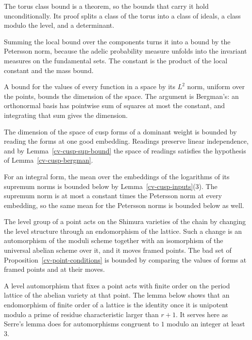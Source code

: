 The torus class bound is a theorem, so the bounds that carry it hold unconditionally. Its proof splits a class
of the torus into a class of ideals, a class modulo the level, and a determinant.

Summing the local bound over the components turns it into a bound by the Petersson norm, because the
adelic probability measure unfolds into the invariant measures on the fundamental sets. The constant
is the product of the local constant and the mass bound.

A bound for the values of every function in a space by its $L^2$ norm, uniform over the points,
bounds the dimension of the space. The argument is Bergman's: an orthonormal basis has pointwise sum of
squares at most the constant, and integrating that sum gives the dimension.

The dimension of the space of cusp forms of a dominant weight is bounded by reading the forms at one
good embedding. Readings preserve linear independence, and by Lemma~\ref{cv-cusp-sup-bound} the space of
readings satisfies the hypothesis of Lemma~\ref{cv-cusp-bergman}.

For an integral form, the mean over the embeddings of the logarithms of its supremum norms is bounded
below by Lemma~\ref{cv-cusp-inputs}(3). The supremum norm is at most a constant times the Petersson norm
at every embedding, so the same mean for the Petersson norms is bounded below as well.

The level group of a point acts on the Shimura varieties of the chain by changing the level structure
through an endomorphism of the lattice. Such a change is an automorphism of the moduli scheme together
with an isomorphism of the universal abelian scheme over it, and it moves framed points. The bad set of
Proposition~\ref{cv-point-conditions} is bounded by comparing the values of forms at framed points and at
their moves.

A level automorphism that fixes a point acts with finite order on the period lattice of the abelian
variety at that point. The lemma below shows that an endomorphism of finite order of a lattice is the
identity once it is unipotent modulo a prime of residue characteristic larger than $r+1$. It serves here
as Serre's lemma does for automorphisms congruent to $1$ modulo an integer at least $3$.

